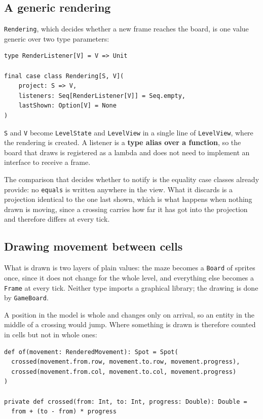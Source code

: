 \subsection{A generic rendering}

\texttt{Rendering}, which decides whether a new frame reaches the board, is one value generic over two type
parameters:

\begin{lstlisting}
type RenderListener[V] = V => Unit

final case class Rendering[S, V](
    project: S => V,
    listeners: Seq[RenderListener[V]] = Seq.empty,
    lastShown: Option[V] = None
)
\end{lstlisting}

\texttt{S} and \texttt{V} become \texttt{LevelState} and \texttt{LevelView} in a single line of \texttt{LevelView}, where the rendering is created. A listener is a \textbf{type alias over a function}, so the board that draws is registered as a lambda and does not need to implement an interface to receive a frame.

The comparison that decides whether to notify is the equality case classes already provide: no \texttt{equals} is
written anywhere in the view. What it discards is a projection identical to the one last shown, which is what happens
when nothing drawn is moving, since a crossing carries how far it has got into the projection and therefore differs at
every tick.

\subsection{Drawing movement between cells}

What is drawn is two layers of plain values: the maze becomes a \texttt{Board} of sprites once, since it does not
change for the whole level, and everything else becomes a \texttt{Frame} at every tick.
Neither type imports a graphical library; the drawing is done by \texttt{GameBoard}.

A position in the model is whole and changes only on arrival, so an entity in the middle of a crossing would jump.
Where something is drawn is therefore counted in cells but not in whole ones:

\begin{lstlisting}
def of(movement: RenderedMovement): Spot = Spot(
  crossed(movement.from.row, movement.to.row, movement.progress),
  crossed(movement.from.col, movement.to.col, movement.progress)
)

private def crossed(from: Int, to: Int, progress: Double): Double =
  from + (to - from) * progress
\end{lstlisting}

